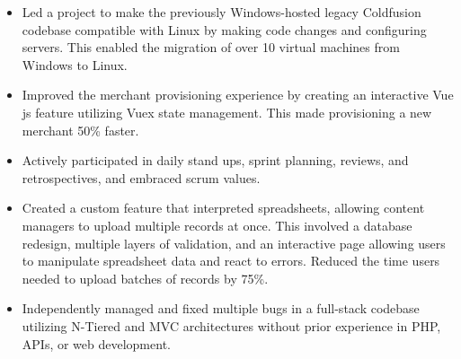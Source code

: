 \documentclass[10pt,a4paper,ragged2e]{altacv}
\begin{document}
\divider

\begin{itemize}
\item Led a project to make the previously Windows-hosted legacy Coldfusion codebase compatible with Linux by making code changes and configuring servers. This enabled the migration of over 10 virtual machines from Windows to Linux.

\smallskip
\smallskip
\item Improved the merchant provisioning experience by creating an interactive Vue js feature utilizing Vuex state management. This made provisioning a new merchant 50\% faster.
\smallskip
\item Actively participated in daily stand ups, sprint planning, reviews, and retrospectives, and embraced scrum values.
\end{itemize}

\divider

\begin{itemize}
\item Created a custom feature that interpreted spreadsheets, allowing content managers to upload multiple records at once. This involved a database redesign, multiple layers of validation, and an interactive page allowing users to manipulate spreadsheet data and react to errors. Reduced the time users needed to upload batches of records by 75\%.
\item Independently managed and fixed multiple bugs in a full-stack codebase utilizing N-Tiered and MVC architectures without prior experience in PHP, APIs, or web development.
\end{itemize}
\end{document}
